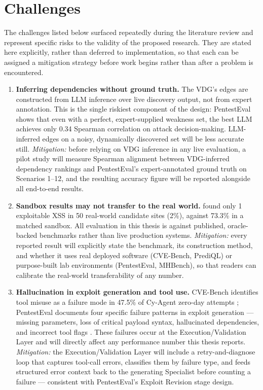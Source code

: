 \section{Challenges}
\label{sec:intro_challenges}

The challenges listed below surfaced repeatedly during the literature review and represent specific risks to the validity of the proposed research. They are stated here explicitly, rather than deferred to implementation, so that each can be assigned a mitigation strategy before work begins rather than after a problem is encountered.

\begin{enumerate}
	\item \textbf{Inferring dependencies without ground truth.} The VDG's edges are constructed from LLM inference over live discovery output, not from expert annotation. This is the single riskiest component of the design: PentestEval \citep{yang2025pentesteval} shows that even with a perfect, expert-supplied weakness set, the best LLM achieves only 0.34 Spearman correlation on attack decision-making. LLM-inferred edges on a noisy, dynamically discovered set will be less accurate still. \textit{Mitigation:} before relying on VDG inference in any live evaluation, a pilot study will measure Spearman alignment between VDG-inferred dependency rankings and PentestEval's expert-annotated ground truth on Scenarios 1--12, and the resulting accuracy figure will be reported alongside all end-to-end results.

	\item \textbf{Sandbox results may not transfer to the real world.} \citet{fang2024hackwebsites} found only 1 exploitable XSS in 50 real-world candidate sites (2\%), against 73.3\% in a matched sandbox. All evaluation in this thesis is against published, oracle-backed benchmarks rather than live production systems. \textit{Mitigation:} every reported result will explicitly state the benchmark, its construction method, and whether it uses real deployed software (CVE-Bench, PrediQL) or purpose-built lab environments (PentestEval, MHBench), so that readers can calibrate the real-world transferability of any number.

	\item \textbf{Hallucination in exploit generation and tool use.} CVE-Bench identifies tool misuse as a failure mode in 47.5\% of Cy-Agent zero-day attempts \citep{zhu2025cvebench}; PentestEval documents four specific failure patterns in exploit generation --- missing parameters, loss of critical payload syntax, hallucinated dependencies, and incorrect tool flags \citep{yang2025pentesteval}. These failures occur at the Execution/Validation Layer and will directly affect any performance number this thesis reports. \textit{Mitigation:} the Execution/Validation Layer will include a retry-and-diagnose loop that captures tool-call errors, classifies them by failure type, and feeds structured error context back to the generating Specialist before counting a failure --- consistent with PentestEval's Exploit Revision stage design.


\end{enumerate}
